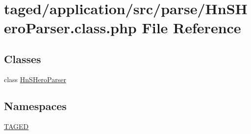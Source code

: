 \hypertarget{_hn_s_hero_parser_8class_8php}{}\section{taged/application/src/parse/\+Hn\+S\+Hero\+Parser.class.\+php File Reference}
\label{_hn_s_hero_parser_8class_8php}
\subsection*{Classes}
\begin{DoxyCompactItemize}
\item 
class \hyperlink{class_hn_s_hero_parser}{Hn\+S\+Hero\+Parser}
\end{DoxyCompactItemize}
\subsection*{Namespaces}
\begin{DoxyCompactItemize}
\item 
 \hyperlink{namespace_t_a_g_e_d}{T\+A\+G\+ED}
\end{DoxyCompactItemize}
